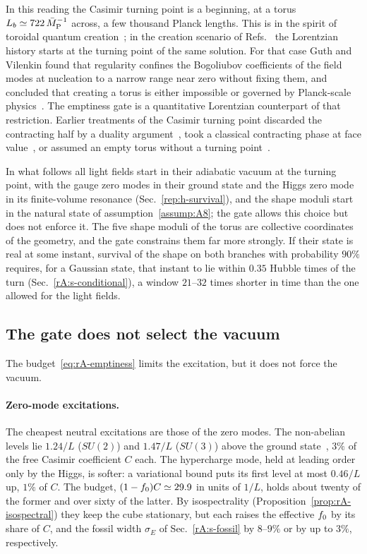 In this reading the Casimir turning point is a beginning, at a torus $L_b\simeq722\,\bar M_{\mathrm{P}}^{-1}$ across, a few thousand Planck lengths. %
This is in the spirit of toroidal quantum creation~\cite{Linde:2004nz,Godet:2026gqw}; in the creation scenario of Refs.~\cite{Zeldovich:1984vk,Guth:2025dal} the Lorentzian history starts at the turning point of the same solution.
For that case Guth and Vilenkin found that regularity confines the Bogoliubov coefficients of the field modes at nucleation to a narrow range near zero without fixing them, and concluded that creating a torus is either impossible or governed by Planck-scale physics~\cite{Guth:2025dal}.
The emptiness gate is a quantitative Lorentzian counterpart of that restriction.
Earlier treatments of the Casimir turning point discarded the contracting half by a duality argument~\cite{McInnes:2005sa}, took a classical contracting phase at face value~\cite{Godlowski:2007gx}, or assumed an empty torus without a turning point~\cite{Fornal:2026qfq}.

In what follows all light fields start in their adiabatic vacuum at the turning point, with the gauge zero modes in their ground state and the Higgs zero mode in its finite-volume resonance (Sec.~\ref{rep:h-survival}), and the shape moduli start in the natural state of assumption~\ref{assump:A8}; the gate allows this choice but does not enforce it.
The five shape moduli of the torus are collective coordinates of the geometry, and the gate constrains them far more strongly.
If their state is real at some instant, survival of the shape on both branches with probability $90\%$ requires, for a Gaussian state, that instant to lie within $0.35$ Hubble times of the turn (Sec.~\ref{rA:s-conditional}), a window $21$--$32$ times shorter in time than the one allowed for the light fields. %

\subsection{The gate does not select the vacuum}
\label{rA:g-excited}

The budget~\eqref{eq:rA-emptiness} limits the excitation, but it does not force the vacuum.

\paragraph{Zero-mode excitations.}
The cheapest neutral excitations are those of the zero modes.
The non-abelian levels lie $1.24/L$ ($SU(2)$) and $1.47/L$ ($SU(3)$) above the ground state~\cite{vanBaal:1988va,Pavel:2021mxn}, $3\%$ of the free Casimir coefficient $C$ each. %
The hypercharge mode, held at leading order only by the Higgs, is softer: a variational bound puts its first level at most $0.46/L$ up, $1\%$ of $C$. %
The budget, $(1-f_0)C\simeq29.9$ in units of $1/L$, holds about twenty of the former and over sixty of the latter. %
By isospectrality (Proposition~\ref{prop:rA-isospectral}) they keep the cube stationary, but each raises the effective $f_0$ by its share of $C$, and the fossil width $\sigma_E$ of Sec.~\ref{rA:s-fossil} by $8$--$9\%$ or by up to $3\%$, respectively. %

